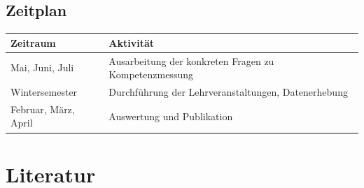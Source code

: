 \documentclass[a4paper,12pt]{article}
\begin{document}
\subsection{Zeitplan}
\begin{tabular}{|l|l|}
    \hline
    Zeitraum & Aktivität \\
    \hline
    Mai, Juni, Juli & Ausarbeitung der konkreten Fragen zu Kompetenzmessung \\
    Wintersemester & Durchführung der Lehrveranstaltungen, Datenerhebung \\
    Februar, März, April & Auswertung und Publikation \\
    \hline
\end{tabular}








\section{Literatur}
\printbibliography
\end{document}
